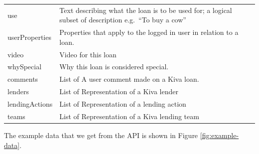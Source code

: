 \begin{longtable}{|p{}|p{}|}
	use                                  & Text describing what the loan is to be used for; a logical subset
	of description e.g.~``To buy a cow''                                                                     \\
	userProperties                       & Properties that apply to the logged in user in relation
	to a loan.                                                                                               \\
	video                                & Video for this loan                                               \\
	whySpecial                           & Why this loan is considered special.                              \\
	comments                             & List of A user comment made on a Kiva loan.                       \\
	lenders                              & List of Representation of a Kiva lender                           \\
	lendingActions                       & List of Representation of a lending action                        \\
	teams                                & List of Representation of a Kiva lending team                     \\
\end{longtable}

The example data that we get from the API is shown in Figure \ref{fig:example-data}.

